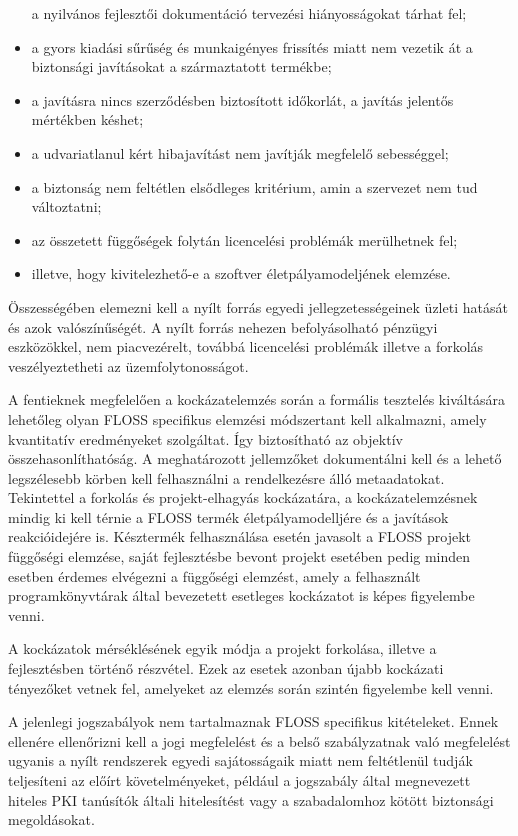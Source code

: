 \documentclass[12pt,magyar,a4paper,oneside]{scrreprt}
\begin{document}
\begin{itemize}
  a nyilvános fejlesztői dokumentáció tervezési hiányosságokat tárhat
  fel;
\item
  a gyors kiadási sűrűség és munkaigényes frissítés miatt nem vezetik át
  a biztonsági javításokat a származtatott termékbe;
\item
  a javításra nincs szerződésben biztosított időkorlát, a javítás
  jelentős mértékben késhet;
\item
  a udvariatlanul kért hibajavítást nem javítják megfelelő sebességgel;
\item
  a biztonság nem feltétlen elsődleges kritérium, amin a szervezet nem
  tud változtatni;
\item
  az összetett függőségek folytán licencelési problémák merülhetnek fel;
\item
  illetve, hogy kivitelezhető-e a szoftver életpályamodeljének elemzése.
\end{itemize}

Összességében elemezni kell a nyílt forrás egyedi jellegzetességeinek
üzleti hatását és azok valószínűségét. A nyílt forrás nehezen
befolyásolható pénzügyi eszközökkel, nem piacvezérelt, továbbá
licencelési problémák illetve a forkolás veszélyeztetheti az
üzemfolytonosságot.

A fentieknek megfelelően a kockázatelemzés során a formális tesztelés
kiváltására lehetőleg olyan FLOSS specifikus elemzési módszertant kell
alkalmazni, amely kvantitatív eredményeket szolgáltat. Így biztosítható
az objektív összehasonlíthatóság. A meghatározott jellemzőket
dokumentálni kell és a lehető legszélesebb körben kell felhasználni a
rendelkezésre álló metaadatokat. Tekintettel a forkolás és
projekt-elhagyás kockázatára, a kockázatelemzésnek mindig ki kell térnie
a FLOSS termék életpályamodelljére és a javítások reakcióidejére is.
Késztermék felhasználása esetén javasolt a FLOSS projekt függőségi
elemzése, saját fejlesztésbe bevont projekt esetében pedig minden
esetben érdemes elvégezni a függőségi elemzést, amely a felhasznált
programkönyvtárak által bevezetett esetleges kockázatot is képes
figyelembe venni.

A kockázatok mérséklésének egyik módja a projekt forkolása, illetve a
fejlesztésben történő részvétel. Ezek az esetek azonban újabb kockázati
tényezőket vetnek fel, amelyeket az elemzés során szintén figyelembe
kell venni.

A jelenlegi jogszabályok nem tartalmaznak FLOSS specifikus kitételeket.
Ennek ellenére ellenőrizni kell a jogi megfelelést és a belső
szabályzatnak való megfelelést ugyanis a nyílt rendszerek egyedi
sajátosságaik miatt nem feltétlenül tudják teljesíteni az előírt
követelményeket, például a jogszabály által megnevezett hiteles PKI
tanúsítók általi hitelesítést vagy a szabadalomhoz kötött biztonsági
megoldásokat.
\end{document}
